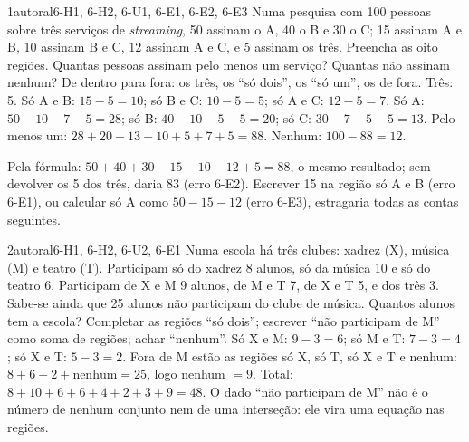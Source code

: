 \begin{exemplo}{}{1}{autoral}{6-H1, 6-H2, 6-U1, 6-E1, 6-E2, 6-E3}
\label{ex:u6:streaming}
Numa pesquisa com 100 pessoas sobre três serviços de \emph{streaming}, 50 assinam o A, 40 o B e 30 o C; 15 assinam A e B, 10 assinam B e C, 12 assinam A e C, e 5 assinam os três. Preencha as oito regiões. Quantas pessoas assinam pelo menos um serviço? Quantas não assinam nenhum?
\plano De dentro para fora: os três, os \enquote{só dois}, os \enquote{só um}, os de fora.
\resolucao Três: 5. Só A e B: $15-5=10$; só B e C: $10-5=5$; só A e C: $12-5=7$. Só A: $50-10-7-5=28$; só B: $40-10-5-5=20$; só C: $30-7-5-5=13$. Pelo menos um: $28+20+13+10+5+7+5=88$. Nenhum: $100-88=12$.
\begin{center}
\end{center}
\comentario Pela fórmula: $50+40+30-15-10-12+5=88$, o mesmo resultado; sem devolver os 5 dos três, daria 83 (erro 6-E2). Escrever 15 na região só A e B (erro 6-E1), ou calcular só A como $50-15-12$ (erro 6-E3), estragaria todas as contas seguintes.
\end{exemplo}

\begin{exemplo}{}{2}{autoral}{6-H1, 6-H2, 6-U2, 6-E1}
\label{ex:u6:clubes}
Numa escola há três clubes: xadrez (X), música (M) e teatro (T). Participam só do xadrez 8 alunos, só da música 10 e só do teatro 6. Participam de X e M 9 alunos, de M e T 7, de X e T 5, e dos três 3. Sabe-se ainda que 25 alunos não participam do clube de música. Quantos alunos tem a escola?
\plano Completar as regiões \enquote{só dois}; escrever \enquote{não participam de M} como soma de regiões; achar \enquote{nenhum}.
\resolucao Só X e M: $9-3=6$; só M e T: $7-3=4$; só X e T: $5-3=2$. Fora de M estão as regiões só X, só T, só X e T e nenhum: $8+6+2+\text{nenhum}=25$, logo nenhum $=9$. Total: $8+10+6+6+4+2+3+9=48$.
\comentario O dado \enquote{não participam de M} não é o número de nenhum conjunto nem de uma interseção: ele vira uma equação nas regiões.
\end{exemplo}


